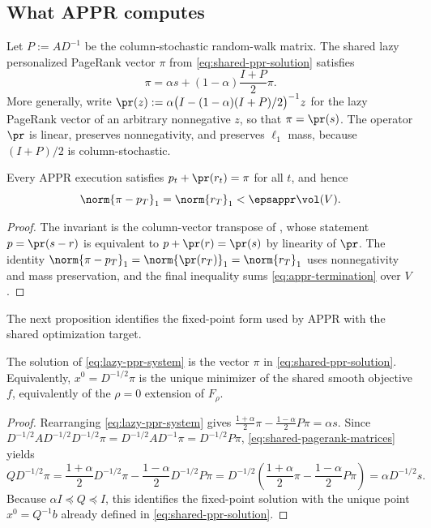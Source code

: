 \subsection{What APPR computes}
\label{subsec:appr-target}

Let \(P:=AD^{-1}\) be the column-stochastic random-walk matrix. The shared
lazy personalized PageRank vector \(\pi\) from
\cref{eq:shared-ppr-solution} satisfies
\begin{equation}
    \pi
    =\alpha s+(1-\alpha)\frac{I+P}{2}\pi.
    \label{eq:lazy-ppr-system}
\end{equation}
More generally, write \(\pr(z):=\alpha\bigl(I-(1-\alpha)(I+P)/2\bigr)^{-1}z\)
for the lazy PageRank vector of an arbitrary nonnegative \(z\), so that
\(\pi=\pr(s)\). The operator \(\pr\) is linear, preserves nonnegativity, and
preserves \(\ell_1\) mass, because \((I+P)/2\) is column-stochastic.

\begin{lemma}
\label{lem:appr-invariant}
Every APPR execution satisfies \(p_t+\pr(r_t)=\pi\) for all \(t\), and hence
\begin{equation}
    \norm{\pi-p_T}_1
    =\norm{r_T}_1
    <\epsappr\vol(V).
    \label{eq:appr-accuracy}
\end{equation}
\end{lemma}

\begin{proof}
The invariant is the column-vector transpose of
\citet[Lemma~3.4]{andersen2007using}, whose statement
\(p=\pr(s-r)\) is equivalent to \(p+\pr(r)=\pr(s)\) by linearity of \(\pr\).
The identity \(\norm{\pi-p_T}_1=\norm{\pr(r_T)}_1=\norm{r_T}_1\) uses
nonnegativity and mass preservation, and the final inequality sums
\cref{eq:appr-termination} over \(V\).
\end{proof}

The next proposition identifies the fixed-point form used by APPR with the
shared optimization target.

\begin{proposition}
\label{prop:appr-rppr-bridge}
The solution of \cref{eq:lazy-ppr-system} is the vector \(\pi\) in
\cref{eq:shared-ppr-solution}. Equivalently,
\(x^0=D^{-1/2}\pi\) is the unique minimizer of the shared smooth
objective \(f\), equivalently of the \(\rho=0\) extension of \(F_\rho\).
\end{proposition}

\begin{proof}
Rearranging \cref{eq:lazy-ppr-system} gives
\(\frac{1+\alpha}{2}\pi-\frac{1-\alpha}{2}P\pi=\alpha s\).
Since \(D^{-1/2}AD^{-1/2}D^{-1/2}\pi=D^{-1/2}AD^{-1}\pi=D^{-1/2}P\pi\),
\cref{eq:shared-pagerank-matrices} yields
\[
    QD^{-1/2}\pi
    =\frac{1+\alpha}{2}D^{-1/2}\pi
     -\frac{1-\alpha}{2}D^{-1/2}P\pi
    =D^{-1/2}\left(
        \frac{1+\alpha}{2}\pi-\frac{1-\alpha}{2}P\pi
    \right)
    =\alpha D^{-1/2}s.
\]
Because \(\alpha I\preceq Q\preceq I\), this identifies the fixed-point
solution with the unique point \(x^0=Q^{-1}b\) already defined in
\cref{eq:shared-ppr-solution}.
\end{proof}


